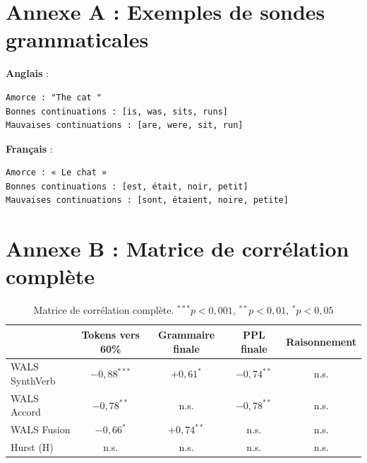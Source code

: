 \documentclass[11pt]{article}
\begin{document}
\section*{Annexe A : Exemples de sondes grammaticales}

\textbf{Anglais} :
\begin{verbatim}
Amorce : "The cat "
Bonnes continuations : [is, was, sits, runs]
Mauvaises continuations : [are, were, sit, run]
\end{verbatim}

\textbf{Français} :
\begin{verbatim}
Amorce : « Le chat »
Bonnes continuations : [est, était, noir, petit]
Mauvaises continuations : [sont, étaient, noire, petite]
\end{verbatim}

\section*{Annexe B : Matrice de corrélation complète}

\begin{table}[h]
\centering
\small
\begin{tabular}{lcccc}
\toprule
& Tokens vers 60\% & Grammaire finale & PPL finale & Raisonnement \\
\midrule
WALS SynthVerb & $-0,88^{***}$ & $+0,61^{*}$ & $-0,74^{**}$ & n.s. \\
WALS Accord & $-0,78^{**}$ & n.s. & $-0,78^{**}$ & n.s. \\
WALS Fusion & $-0,66^{*}$ & $+0,74^{**}$ & n.s. & n.s. \\
Hurst (H) & n.s. & n.s. & n.s. & n.s. \\
\bottomrule
\end{tabular}
\caption{Matrice de corrélation complète. $^{***}p<0,001$, $^{**}p<0,01$, $^{*}p<0,05$}
\end{table}

\vspace{2em}
\begin{center}
\end{center}



\end{document}
